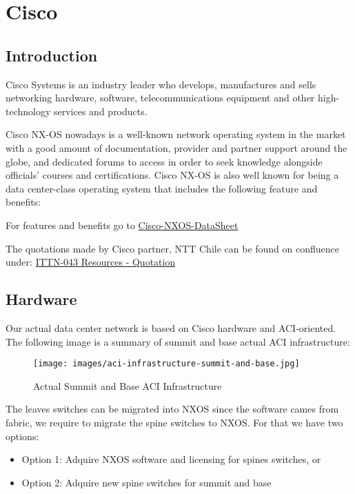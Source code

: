 \section{Cisco}

\subsection{Introduction}

Cisco Systems is an industry leader who develops, manufactures and sells networking hardware, software, telecommunications equipment and other high-technology services and products.

Cisco NX-OS nowadays is a  well-known network operating system in the market with a good amount of documentation, provider and partner support around the globe, and dedicated forums to access in order to seek knowledge alongside officials’ courses and certifications. Cisco NX-OS is also well known for being a data center-class operating system that includes the following feature and benefits:

For features and benefits go to \href{https://www.cisco.com/c/en/us/products/collateral/ios-nx-os-software/nx-os-software/data_sheet_c78-652063.pdf}{Cisco-NXOS-DataSheet}

The quotations made by Cisco partner, NTT Chile can be found on confluence under: \href{https://confluence.lsstcorp.org/display/IT/ITTN-043+-+Rubin+Network+Re-Engineering}{ITTN-043 Resources - Quotation}

\subsection{Hardware}

Our actual data center network is based on Cisco hardware and ACI-oriented. The following image is a summary of summit and base actual ACI infrastructure:

\begin{figure}
   \texttt{[image: images/aci-infrastructure-summit-and-base.jpg]}
   \centering
   \caption{Actual Summit and Base ACI Infrastructure}
\end{figure}

The leaves switches can be migrated into NXOS since the software cames from fabric, we require to migrate the spine switches to NXOS. For that we have two options:

\begin{itemize}
    \item Option 1: Adquire NXOS software and licensing for spines switches, or
    \item Option 2: Adquire new spine switches for summit and base 
\end{itemize}

